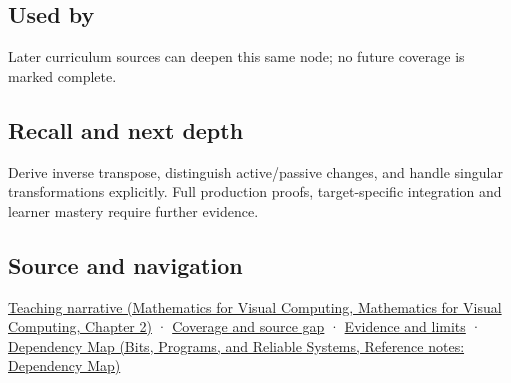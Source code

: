\subsection{Used by}\label{appendix-46da295c6787-used-by}

Later curriculum sources can deepen this same node; no future coverage is marked complete.

\subsection{Recall and next depth}\label{appendix-46da295c6787-recall-and-next-depth}

Derive inverse transpose, distinguish active/passive changes, and handle singular transformations explicitly. Full production proofs, target-specific integration and learner mastery require further evidence.

\subsection{Source and navigation}\label{appendix-46da295c6787-source-and-navigation}

\href{../02-Mathematics-for-Visual-Computing/main.pdf\#nameddest=01-foundations-i-ch018-a-normal-is-a-measuring-rule-before-it-is-an-arrow}{Teaching narrative (Mathematics for Visual Computing, Mathematics for Visual Computing, Chapter 2)} · \hyperref[appendix-fd090d982a15-phase-6---parts-501-600]{Coverage and source gap} · \hyperref[appendix-a103e7846d21-phase-6---source-analysis-and-verification]{Evidence and limits} · \href{../01-Bits-Programs-and-Reliable-Systems/main.pdf\#nameddest=appendix-4ad47bdd269a}{Dependency Map (Bits, Programs, and Reliable Systems, Reference notes: Dependency Map)}
